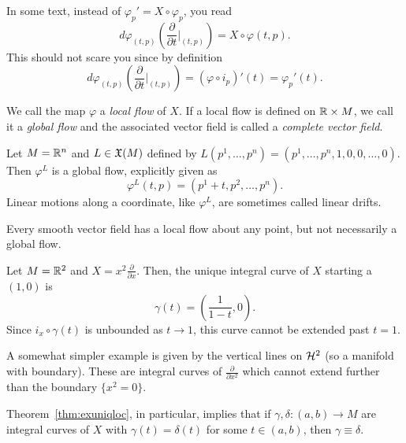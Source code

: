 \begin{remark}
  In some text, instead of $\varphi_p' = X\circ\varphi_p$, you read
  \begin{equation}
    d\varphi_{(t,p)}\left(\frac{\partial}{\partial t}\Big|_{(t,p)}\right) = X \circ \varphi(t,p).
  \end{equation}
  This should not scare you since by definition
  \begin{equation}
    d\varphi_{(t,p)}\left(\frac{\partial}{\partial t}\Big|_{(t,p)}\right) = (\varphi \circ i_p)'(t) = \varphi_p'(t).
  \end{equation}
\end{remark}

We call the map $\varphi$ a \emph{local flow} of $X$.
If a local flow is defined on $\mathbb{R}\times M$, we call it a \emph{global flow} and the associated vector field is called a \emph{complete vector field}.

\begin{example}\label{example:lineardrift}
  Let $M=\mathbb{R}^n$ and $L\in\mathfrak{X}(M)$ defined by $L(p^1, \ldots, p^n) = (p^1, \ldots, p^n, 1, 0, 0, \ldots, 0)$.
  Then $\varphi^L$ is a global flow, explicitly given as
  \begin{equation}
    \varphi^L(t,p) = (p^1+t, p^2, \ldots, p^n).
  \end{equation}
  Linear motions along a coordinate, like $\varphi^L$, are sometimes called linear drifts.
\end{example}

Every smooth vector field has a local flow about any point, but not necessarily a global flow.
\begin{example}\label{ex:non-complete}
  Let $M = \mathbb{R}^2$ and $X = x^2 \frac{\partial}{\partial x}$.
  Then, the unique integral curve of $X$ starting a $(1,0)$ is
  \begin{equation}
    \gamma(t) = \left(\frac{1}{1-t}, 0\right).
  \end{equation}
  Since $i_x \circ \gamma(t)$ is unbounded as $t\to 1$, this curve cannot be extended past $t=1$.

  A somewhat simpler example is given by the vertical lines on $\mathcal{H}^2$ (so a manifold with boundary). These are integral curves of $\frac{\partial}{\partial x^2}$ which cannot extend further than the boundary $\{x^2=0\}$.
\end{example}

Theorem~\ref{thm:exuniqloc}, in particular, implies that if $\gamma, \delta : (a,b)\to M$ are integral curves of $X$ with $\gamma(t) = \delta(t)$ for some $t \in(a,b)$, then $\gamma\equiv\delta$.

